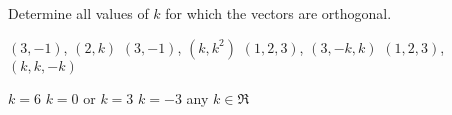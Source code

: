 
\begin{Exercise}[
name={},
title={}, 
difficulty=0,
origin={\cite{SM}}]
Determine all values of $k$ for which the vectors are orthogonal.
\begin{multicols}{2}
\Question $(3,-1)$, $(2,k)$
\Question $(3,-1)$, $(k,k^2)$
\Question $(1,2,3)$, $(3,-k,k)$
\Question $(1,2,3)$, $(k,k,-k)$
\EndCurrentQuestion
\end{multicols}
\end{Exercise}

\begin{Answer}
\Question $k=6$
\Question $k=0$ or $k=3$
\Question $k=-3$
\Question any $k\in\Re$
\end{Answer}

